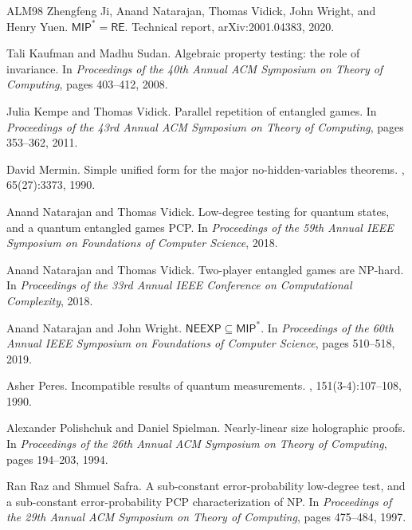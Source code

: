 \documentclass[11pt]{article}
\theoremstyle{definition}
\begin{document}
\begin{thebibliography}{ALM{\etalchar{+}}98}
Zhengfeng Ji, Anand Natarajan, Thomas Vidick, John Wright, and Henry Yuen.
\newblock $\mathsf{MIP}^* = \mathsf{RE}$.
\newblock Technical report, arXiv:2001.04383, 2020.

Tali Kaufman and Madhu Sudan.
\newblock Algebraic property testing: the role of invariance.
\newblock In {\em Proceedings of the 40th Annual ACM Symposium on Theory of
  Computing}, pages 403--412, 2008.

Julia Kempe and Thomas Vidick.
\newblock Parallel repetition of entangled games.
\newblock In {\em Proceedings of the 43rd Annual ACM Symposium on Theory of
  Computing}, pages 353--362, 2011.

David Mermin.
\newblock Simple unified form for the major no-hidden-variables theorems.
, 65(27):3373, 1990.

Anand Natarajan and Thomas Vidick.
\newblock Low-degree testing for quantum states, and a quantum entangled games
  {PCP}.
\newblock In {\em Proceedings of the 59th Annual IEEE Symposium on Foundations
  of Computer Science}, 2018.

Anand Natarajan and Thomas Vidick.
\newblock Two-player entangled games are {NP}-hard.
\newblock In {\em Proceedings of the 33rd Annual IEEE Conference on
  Computational Complexity}, 2018.

Anand Natarajan and John Wright.
\newblock $\mathsf{NEEXP} \subseteq \mathsf{MIP}^*$.
\newblock In {\em Proceedings of the 60th Annual IEEE Symposium on Foundations
  of Computer Science}, pages 510--518, 2019.

Asher Peres.
\newblock Incompatible results of quantum measurements.
, 151(3-4):107--108, 1990.

Alexander Polishchuk and Daniel Spielman.
\newblock Nearly-linear size holographic proofs.
\newblock In {\em Proceedings of the 26th Annual ACM Symposium on Theory of
  Computing}, pages 194--203, 1994.

Ran Raz and Shmuel Safra.
\newblock A sub-constant error-probability low-degree test, and a sub-constant
  error-probability {PCP} characterization of {NP}.
\newblock In {\em Proceedings of the 29th Annual ACM Symposium on Theory of
  Computing}, pages 475--484, 1997.


\end{thebibliography}
\end{document}

